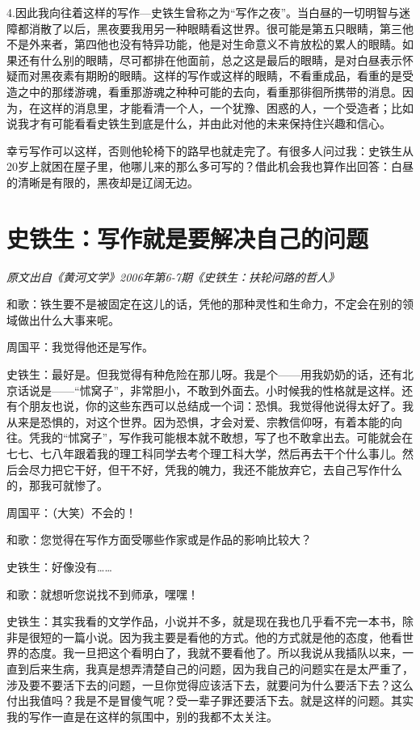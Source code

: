 \documentclass[fontset=fandol,12pt,a5paper]{ctexbook}
\begin{document}
4.因此我向往着这样的写作—史铁生曾称之为“写作之夜”。当白昼的一切明智与迷障都消散了以后，黑夜要我用另一种眼睛看这世界。很可能是第五只眼睛，第三他不是外来者，第四他也没有特异功能，他是对生命意义不肯放松的累人的眼睛。如果还有什么别的眼睛，尽可都排在他面前，总之这是最后的眼睛，是对白昼表示怀疑而对黑夜素有期盼的眼睛。这样的写作或这样的眼睛，不看重成品，看重的是受造之中的那缕游魂，看重那游魂之种种可能的去向，看重那徘徊所携带的消息。因为，在这样的消息里，才能看清一个人，一个犹豫、困惑的人，一个受造者；比如说我才有可能看看史铁生到底是什么，并由此对他的未来保持住兴趣和信心。

幸亏写作可以这样，否则他轮椅下的路早也就走完了。有很多人问过我：史铁生从20岁上就困在屋子里，他哪儿来的那么多可写的？借此机会我也算作出回答：白昼的清晰是有限的，黑夜却是辽阔无边。

\newpage

\section{史铁生：写作就是要解决自己的问题}

\emph{原文出自《黄河文学》2006年第6-7期《史铁生：扶轮问路的哲人》}
\vspace{2em}

和歌：铁生要不是被固定在这儿的话，凭他的那种灵性和生命力，不定会在别的领域做出什么大事来呢。

周国平：我觉得他还是写作。

史铁生：最好是。但我觉得有种危险在那儿呀。我是个——用我奶奶的话，还有北京话说是——“怵窝子”，非常胆小，不敢到外面去。小时候我的性格就是这样。还有个朋友也说，你的这些东西可以总结成一个词：恐惧。我觉得他说得太好了。我从来是恐惧的，对这个世界。因为恐惧，才会对爱、宗教信仰呀，有着本能的向往。凭我的“怵窝子”，写作我可能根本就不敢想，写了也不敢拿出去。可能就会在七七、七八年跟着我的理工科同学去考个理工科大学，然后再去干个什么事儿。然后会尽力把它干好，但干不好，凭我的魄力，我还不能放弃它，去自己写作什么的，那我可就惨了。

周国平：（大笑）不会的！

和歌：您觉得在写作方面受哪些作家或是作品的影响比较大？

史铁生：好像没有……

和歌：就想听您说找不到师承，嘿嘿！

史铁生：其实我看的文学作品，小说并不多，就是现在我也几乎看不完一本书，除非是很短的一篇小说。因为我主要是看他的方式。他的方式就是他的态度，他看世界的态度。我一旦把这个看明白了，我就不要看他了。所以我说从我插队以来，一直到后来生病，我真是想弄清楚自己的问题，因为我自己的问题实在是太严重了，涉及要不要活下去的问题，一旦你觉得应该活下去，就要问为什么要活下去？这么付出我值吗？我是不是冒傻气呢？受一辈子罪还要活下去。就是这样的问题。其实我的写作一直是在这样的氛围中，别的我都不太关注。
\end{document}
